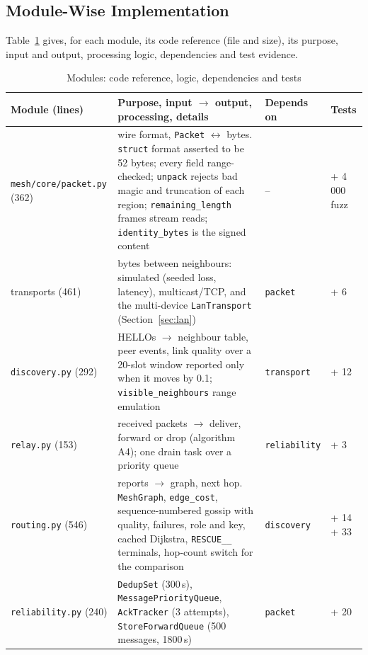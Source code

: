 \subsection{Module-Wise Implementation}
\label{sec:modules}
Table~\ref{tab:impl} gives, for each module, its code reference (file and size), its purpose, input and output, processing logic, dependencies and test evidence.
\begin{table}[!htbp]
\caption{Modules: code reference, logic, dependencies and tests}
\label{tab:impl}
\footnotesize
\begin{tabularx}{\textwidth}{@{}>{\raggedright\arraybackslash}p{3.55cm}>{\raggedright\arraybackslash}X>{\raggedright\arraybackslash}p{2.25cm}>{\raggedright\arraybackslash}p{1.8cm}@{}}
\toprule
\textbf{Module (lines)} & \textbf{Purpose, input $\rightarrow$ output, processing, details} & \textbf{Depends on} & \textbf{Tests}\\ \midrule
\texttt{mesh/core/packet.py} (362) & wire format, \texttt{Packet} $\leftrightarrow$ bytes. \texttt{struct} format asserted to be 52 bytes; every field range-checked; \texttt{unpack} rejects bad magic and truncation of each region; \texttt{remaining\_length} frames stream reads; \texttt{identity\_bytes} is the signed content & -- & 47 + 4\,000 fuzz\\
transports (461) & bytes between neighbours: simulated (seeded loss, latency), multicast/TCP, and the multi-device \texttt{LanTransport} (Section~\ref{sec:lan}) & \texttt{packet} & 15 + 6\\
\texttt{discovery.py} (292) & HELLOs $\rightarrow$ neighbour table, peer events, link quality over a 20-slot window reported only when it moves by 0.1; \texttt{visible\_neighbours} range emulation & \texttt{transport} & 15 + 12\\
\texttt{relay.py} (153) & received packets $\rightarrow$ deliver, forward or drop (algorithm A4); one drain task over a priority queue & \texttt{reliability} & 18 + 3\\
\texttt{routing.py} (546) & reports $\rightarrow$ graph, next hop. \texttt{MeshGraph}, \texttt{edge\_cost}, sequence-numbered gossip with quality, failures, role and key, cached Dijkstra, \texttt{RESCUE\_\_} terminals, hop-count switch for the comparison & \texttt{discovery} & 14 + 14 + 33\\
\texttt{reliability.py} (240) & \texttt{DedupSet} (300\,s), \texttt{MessagePriorityQueue}, \texttt{AckTracker} (3 attempts), \texttt{StoreForwardQueue} (500 messages, 1800\,s) & \texttt{packet} & 18 + 20\\

\end{tabularx}
\end{table}
